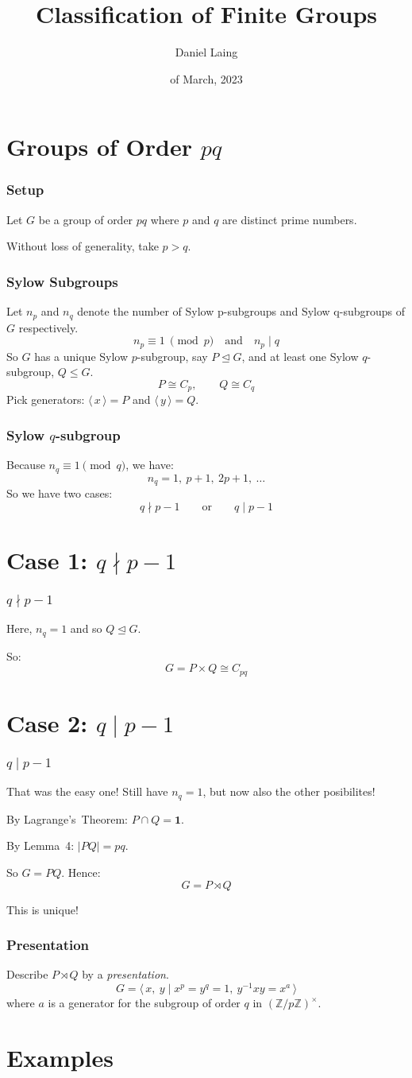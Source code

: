 \documentclass[12pt]{beamer}
\title{Classification of Finite Groups}
\author{Daniel Laing}
\date{\nth{23} of March, 2023}
\institute{\textit{MT4599}}
\newcommand{\nrmsgp}{\unlhd}
\newcommand{\gen}[1]{\langle\,#1\,\rangle}
\begin{document}
\frame{\titlepage}

\section{Groups of Order \(pq\)}

\begin{frame}
\frametitle{Setup}
Let \(G\) be a group of order \(pq\) where \(p\) and \(q\) are distinct prime numbers.

Without loss of generality, take \(p > q\).
\end{frame}

\begin{frame}
\frametitle{Sylow Subgroups}
Let \(n_p\) and \(n_q\) denote the number of Sylow p-subgroups and Sylow q-subgroups of \(G\) respectively.
\[n_p \equiv 1 \ \pmod{p} \quad \text{and} \quad n_p \mid q\]
So \(G\) has a unique Sylow \(p\)-subgroup, say \(P \nrmsgp G\), and at least one Sylow \(q\)-subgroup, \(Q \leqslant
    G\).
\[ P \cong C_{p}, \qquad Q \cong C_{q} \]
Pick generators: \(\gen{x} = P\) and \(\gen{y} = Q\).
\end{frame}

\begin{frame}
\frametitle{Sylow \(q\)-subgroup}
Because \(n_{q} \equiv 1 \pmod{q}\), we have:
\[ n_{q} = 1,\ p + 1,\ 2p + 1,\ \ldots \]
So we have two cases:
\[ q \nmid p-1 \qquad \text{or} \qquad q \mid p-1 \]
\end{frame}

\section{Case 1: \(q \nmid p-1\)}

\begin{frame}
\frametitle{\(q \nmid p-1\)}
Here, \(n_{q} = 1\) and so \(Q \nrmsgp G\).

So:
\[ G = P \times Q \cong C_{pq} \]
\end{frame}

\section{Case 2: \(q \mid p-1\)}
\begin{frame}
\frametitle{\(q \mid p-1\)}
That was the easy one!
Still have \(n_q = 1\), but now also the other posibilites!

By Lagrange's~Theorem: \(P \cap Q = \bm{1}\).

By Lemma~4: \(|PQ| = pq\).

So \(G = PQ\).
Hence:
\[ G = P \rtimes Q \]

This is unique!
\end{frame}

\begin{frame}
\frametitle{Presentation}
Describe \(P \rtimes Q\) by a \emph{presentation}.
\[ G = \gen{x,\ y \mid x^p = y^q = 1,\ y^{-1}xy = x^a} \]
where \(a\) is a generator for the subgroup of order \(q\) in \({(\mathbb{Z}/p\mathbb{Z})}^\times\).
\end{frame}

\section{Examples}
\end{document}
